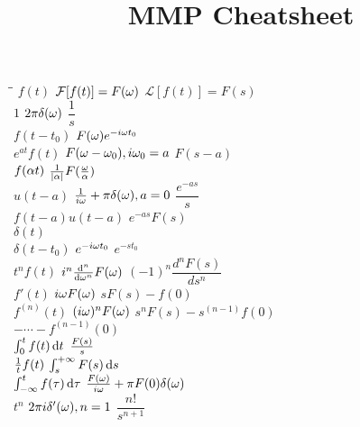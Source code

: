 \documentclass[UTF8,8pt]{ctexart}
\title{MMP Cheatsheet}
\newcommand{\Laplace}[1]{\ensuremath{\mathcal{L}{\left[#1\right]}}}
\begin{document}
 
\leftmargini=5mm
\raggedright
\footnotesize


\begin{multicols}{2}

    \begin{tabbing}
    \hspace{1.5 in}\=\hspace{1.5in}\= \kill
    $f(t)$                                      \> $\mathcal{F}[f(t)]=F(\o)$        \> $\Laplace{f(t)}=F(s)$ \\
    $1$       			                        \>$2\pi\de(\o)$        \> $\dfrac{1}{s}$            \\
    $f(t-t_0)$                                  \>$F(\o)e^{-i\o t_0}$\\
    $e^{at}f(t)$	                            \>$F(\o-\o_0),i\o_0=a$        \> $F(s-a)$	  \\ 
    $f(\a t)$                                   \>$\ff{|\a|}F(\f{\o}{\a})$ \>\\
    $u(t-a)$                                    \>$\ff{i\o}+\pi\de(\o),a=0$        \> $\dfrac{e^{-as}}{s}$  \\
    $f(t-a)u(t-a)$                              \>        \> $e^{-as}F(s)$  \\
    $\delta(t)$	                                          \\
    $\delta(t-t_0)$                             \>$e^{-i\o t_0}$        \> $e^{-st_0}$  \\
    $t^nf(t)$ 	                                \>$i^n\dd[n]{}{\o}F(\o)$      \> $(-1)^n\dfrac{d^nF(s)}{ds^n}$   \\
    $f'(t)$ 	                                \>$i\o F(\o)$        \> $sF(s) - f(0)$  \\
    $f^{(n)}(t)$ 	                            \>$(i\o)^nF(\o)$        \> $s^nF(s) - s^{(n-1)} f(0)$\\
                \>        \> $- \cdots - f^{(n-1)}(0)$  \\
    $\int_0^t f(t)\d t$                         \>                                  \> $\f{F(s)}{s}$  \\
    $\ff{t}f(t)$                                \>                                  \>$\int_s^{+\inf}F(s)\d s$\\
    $\int_{-\inf}^tf(\tau)\d \tau$              \>$\f{F(\o)}{i\o}+\pi F(0)\de(\o)$          \\
    $t^n$                                       \>$2\pi i\de'(\o),n=1$        \> $\dfrac{n!}{s^{n+1}}$     \\

\end{tabbing}
\end{multicols}
\end{document}
